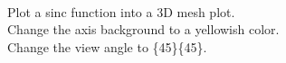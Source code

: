 \documentclass{article}
\begin{document}
\\
\vspace{30pt}
\raggedright{
Plot a sinc function into a 3D mesh plot. \\
\vspace{20pt}
Change the axis background to a yellowish color.\\
\vspace{20pt}
Change the view angle to \{45\}\{45\}.}
\end{document}
